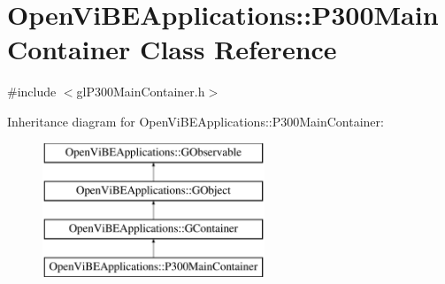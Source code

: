 \hypertarget{classOpenViBEApplications_1_1P300MainContainer}{
\section{OpenViBEApplications::P300MainContainer Class Reference}
\label{classOpenViBEApplications_1_1P300MainContainer}
}


{\ttfamily \#include $<$glP300MainContainer.h$>$}

Inheritance diagram for OpenViBEApplications::P300MainContainer:\begin{figure}[H]
\begin{center}
\leavevmode
\includegraphics[height=4.000000cm]{classOpenViBEApplications_1_1P300MainContainer}
\end{center}
\end{figure}
